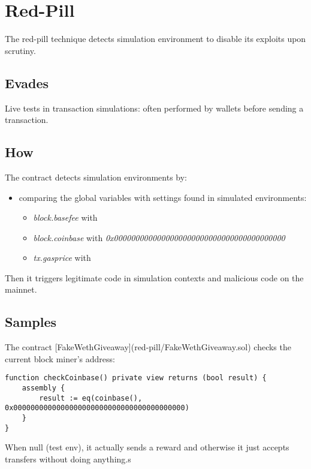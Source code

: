 \section{Red-Pill} \label{sec:red-pill}

The red-pill technique detects simulation environment to disable its exploits upon scrutiny. 

\subsection{Evades}

Live tests in transaction simulations: often performed by wallets before sending a transaction.

\subsection{How}

The contract detects simulation environments by:

\begin{itemize}
\item{comparing the global variables with settings found in simulated environments:
\begin{itemize}
    \item{\emph{block.basefee} with}
    \item{\emph{block.coinbase} with \emph{0x0000000000000000000000000000000000000000}}
    \item{\emph{tx.gasprice} with}
\end{itemize}}
\end{itemize}

Then it triggers legitimate code in simulation contexts and malicious code on the mainnet.

\subsection{Samples}

The contract [FakeWethGiveaway](red-pill/FakeWethGiveaway.sol) checks the current block miner’s address:

\begin{lstlisting}[language=Solidity]
function checkCoinbase() private view returns (bool result) {
    assembly {
        result := eq(coinbase(), 0x0000000000000000000000000000000000000000)
    }
}
\end{lstlisting}

When null (test env), it actually sends a reward and otherwise it just accepts transfers without doing anything.s

